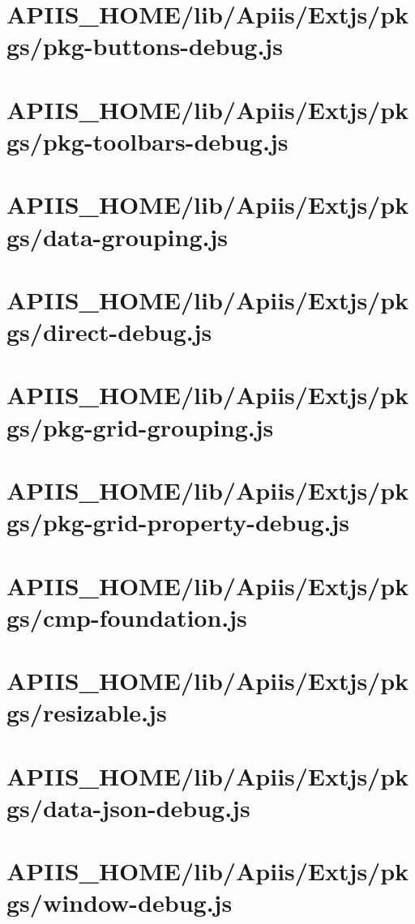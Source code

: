 \section{APIIS\_HOME/lib/Apiis/Extjs/pkgs/pkg-buttons-debug.js} 
\section{APIIS\_HOME/lib/Apiis/Extjs/pkgs/pkg-toolbars-debug.js} 
\section{APIIS\_HOME/lib/Apiis/Extjs/pkgs/data-grouping.js} 
\section{APIIS\_HOME/lib/Apiis/Extjs/pkgs/direct-debug.js} 
\section{APIIS\_HOME/lib/Apiis/Extjs/pkgs/pkg-grid-grouping.js} 
\section{APIIS\_HOME/lib/Apiis/Extjs/pkgs/pkg-grid-property-debug.js} 
\section{APIIS\_HOME/lib/Apiis/Extjs/pkgs/cmp-foundation.js} 
\section{APIIS\_HOME/lib/Apiis/Extjs/pkgs/resizable.js} 
\section{APIIS\_HOME/lib/Apiis/Extjs/pkgs/data-json-debug.js} 
\section{APIIS\_HOME/lib/Apiis/Extjs/pkgs/window-debug.js} 
